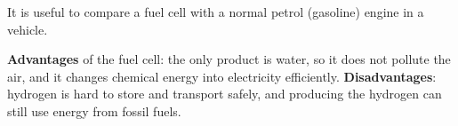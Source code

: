 \documentclass[11pt]{article}
\begin{document}
It is useful to compare a fuel cell with a normal petrol (gasoline) engine in a vehicle.

\begin{center}
\end{center}

\textbf{Advantages} of the fuel cell: the only product is water, so it does not pollute the air, and it changes chemical energy into electricity efficiently. \textbf{Disadvantages}: hydrogen is hard to store and transport safely, and producing the hydrogen can still use energy from fossil fuels.
\end{document}
